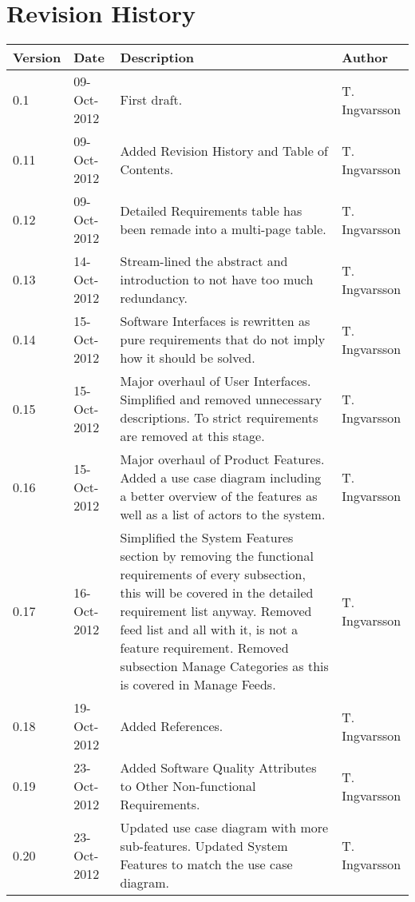 \section*{Revision History}
\begin{center}
    \begin{tabularx}{\linewidth}{ | l | l | X | l |}
    \hline
    \textbf{Version} & \textbf{Date} & \textbf{Description} & \textbf{Author}\\ \hline
    0.1 & 09-Oct-2012 & First draft. & T. Ingvarsson\\ \hline
    0.11 & 09-Oct-2012 & Added Revision History and Table of Contents. & T. Ingvarsson\\ \hline
    0.12 & 09-Oct-2012 & Detailed Requirements table has been remade into a multi-page table. & T. Ingvarsson\\ \hline
    0.13 & 14-Oct-2012 & Stream-lined the abstract and introduction to not have too much redundancy. & T. Ingvarsson\\ \hline
    0.14 & 15-Oct-2012 & Software Interfaces is rewritten as pure requirements that do not imply how it should be solved. & T. Ingvarsson \\ \hline
    0.15 & 15-Oct-2012 & Major overhaul of User Interfaces. Simplified and removed unnecessary descriptions. To strict requirements are removed at this stage. & T. Ingvarsson\\ \hline
    0.16 & 15-Oct-2012 & Major overhaul of Product Features. Added a use case diagram including a better overview of the features as well as a list of actors to the system. & T. Ingvarsson\\ \hline
    0.17 & 16-Oct-2012 & Simplified the System Features section by removing the functional requirements of every subsection, this will be covered in the detailed requirement list anyway. Removed feed list and all with it, is not a feature requirement.  Removed subsection Manage Categories as this is covered in Manage Feeds. & T. Ingvarsson\\ \hline
    0.18 & 19-Oct-2012 & Added References. & T. Ingvarsson\\ \hline
    0.19 & 23-Oct-2012 & Added Software Quality Attributes to Other Non-functional Requirements. & T. Ingvarsson\\ \hline
    0.20 & 23-Oct-2012 & Updated use case diagram with more sub-features. Updated System Features to match the use case diagram. & T. Ingvarsson\\ \hline
    \end{tabularx}
    

\end{center}
